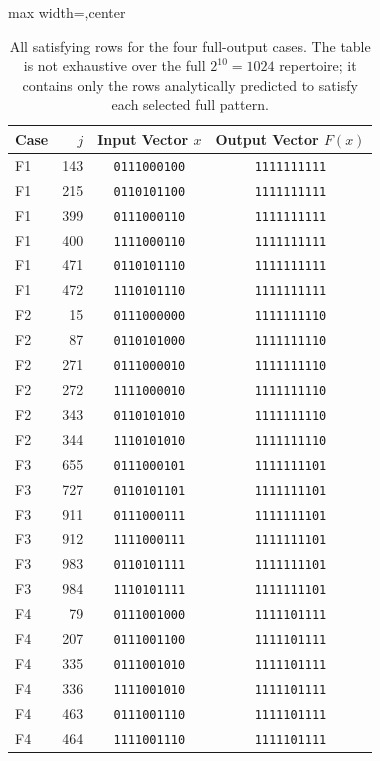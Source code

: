 \documentclass[11pt]{article}
\theoremstyle{definition}
\begin{document}
\begin{table}[H]
\centering
\setlength{\tabcolsep}{4pt}
\footnotesize
\begin{adjustbox}{max width=\textwidth,center}
\begin{tabular}{@{}lrcc@{}}
\toprule
Case & \(j\) & Input Vector \(x\) & Output Vector \(F(x)\)\\
\midrule
F1 & 143 & \texttt{0111000100} & \texttt{1111111111} \\
F1 & 215 & \texttt{0110101100} & \texttt{1111111111} \\
F1 & 399 & \texttt{0111000110} & \texttt{1111111111} \\
F1 & 400 & \texttt{1111000110} & \texttt{1111111111} \\
F1 & 471 & \texttt{0110101110} & \texttt{1111111111} \\
F1 & 472 & \texttt{1110101110} & \texttt{1111111111} \\
F2 & 15 & \texttt{0111000000} & \texttt{1111111110} \\
F2 & 87 & \texttt{0110101000} & \texttt{1111111110} \\
F2 & 271 & \texttt{0111000010} & \texttt{1111111110} \\
F2 & 272 & \texttt{1111000010} & \texttt{1111111110} \\
F2 & 343 & \texttt{0110101010} & \texttt{1111111110} \\
F2 & 344 & \texttt{1110101010} & \texttt{1111111110} \\
F3 & 655 & \texttt{0111000101} & \texttt{1111111101} \\
F3 & 727 & \texttt{0110101101} & \texttt{1111111101} \\
F3 & 911 & \texttt{0111000111} & \texttt{1111111101} \\
F3 & 912 & \texttt{1111000111} & \texttt{1111111101} \\
F3 & 983 & \texttt{0110101111} & \texttt{1111111101} \\
F3 & 984 & \texttt{1110101111} & \texttt{1111111101} \\
F4 & 79 & \texttt{0111001000} & \texttt{1111101111} \\
F4 & 207 & \texttt{0111001100} & \texttt{1111101111} \\
F4 & 335 & \texttt{0111001010} & \texttt{1111101111} \\
F4 & 336 & \texttt{1111001010} & \texttt{1111101111} \\
F4 & 463 & \texttt{0111001110} & \texttt{1111101111} \\
F4 & 464 & \texttt{1111001110} & \texttt{1111101111} \\
\bottomrule
\end{tabular}
\end{adjustbox}
\caption{All satisfying rows for the four full-output cases. The table is not exhaustive over the full \(2^{10}=1024\) repertoire; it contains only the rows analytically predicted to satisfy each selected full pattern.}
\label{tab:mixed10-full-rows}
\end{table}
\end{document}
